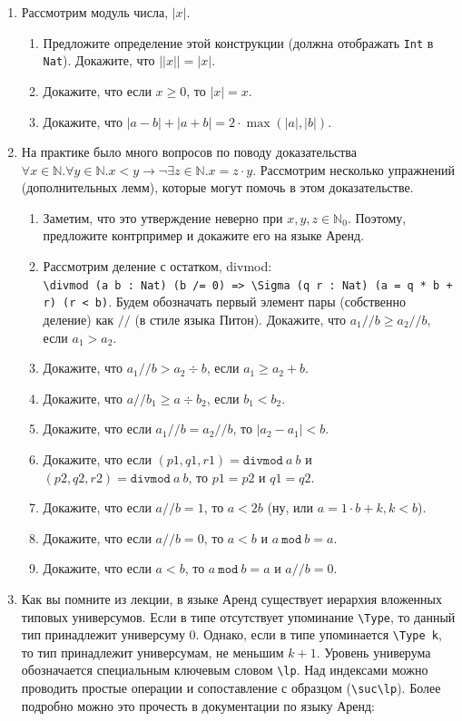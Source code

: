 \documentclass[10pt,a4paper,oneside]{article}
\begin{document}
\begin{enumerate}

\item Рассмотрим модуль числа, $|x|$.
\begin{enumerate}
\item Предложите определение этой конструкции (должна отображать \verb!Int! в \verb!Nat!). Докажите, что $||x|| = |x|$.
\item Докажите, что если $x \ge 0$, то $|x|=x$.
\item Докажите, что $|a - b| + |a + b| = 2\cdot\max(|a|,|b|)$.
\end{enumerate}

\item На практике было много вопросов по поводу доказательства 
$\forall x\in\mathbb{N}.\forall y\in\mathbb{N}.x < y \rightarrow \neg\exists z\in\mathbb{N}.x = z\cdot y$.
Рассмотрим несколько упражнений (дополнительных лемм), которые могут помочь в этом доказательстве.
\begin{enumerate}
\item Заметим, что это утверждение неверно при $x,y,z\in\mathbb{N}_0$.
Поэтому, предложите контрпример и докажите его на языке Аренд.
\item Рассмотрим деление с остатком, divmod:\\ 
\verb!\divmod (a b : Nat) (b /= 0) => \Sigma (q r : Nat) (a = q * b + r) (r < b)!.
Будем обозначать первый элемент пары (собственно деление) как $//$ (в стиле языка Питон).
Докажите, что $a_1 // b \geq a_2 // b$, если $a_1 > a_2$.
\item Докажите, что $a_1 // b > a_2 \div b$, если $a_1 \geq a_2 + b$.
\item Докажите, что $a // b_1 \geq a \div b_2$, если $b_1 < b_2$.
\item Докажите, что если $a_1 // b = a_2 // b$, то $|a_2 - a_1| < b$.
\item Докажите, что если $(p1,q1,r1) = \texttt{divmod}\ a\ b$ и $(p2,q2,r2) = \texttt{divmod}\ a\ b$, то $p1=p2$ и $q1=q2$.
\item Докажите, что если $a // b = 1$, то $a < 2b$ (ну, или $a = 1\cdot b + k, k < b$).
\item Докажите, что если $a // b = 0$, то $a < b$ и $a\ \texttt{mod}\ b = a$.
\item Докажите, что если $a < b$, то $a\ \texttt{mod}\ b = a$ и $a // b = 0$.
\end{enumerate}

\item Как вы помните из лекции, в языке Аренд существует иерархия вложенных типовых универсумов. Если в типе отсутствует
упоминание \verb!\Type!, то данный тип принадлежит универсуму 0. Однако, если в типе упоминается \verb!\Type k!,
то тип принадлежит универсумам, не меньшим $k+1$. Уровень универума обозначается специальным ключевым словом \verb!\lp!.
Над индексами можно проводить простые операции и сопоставление с образцом (\verb!\suc\lp!). Более подробно
можно это прочесть в документации по языку Аренд:


\end{enumerate}
\end{document}
